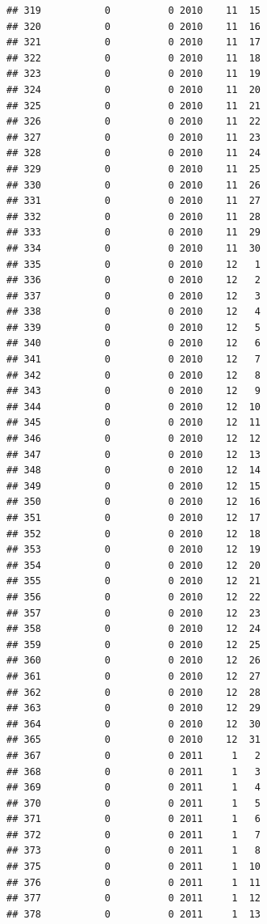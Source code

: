 \documentclass[
]{article}
\begin{document}
\begin{verbatim}
## 319           0          0 2010    11  15
## 320           0          0 2010    11  16
## 321           0          0 2010    11  17
## 322           0          0 2010    11  18
## 323           0          0 2010    11  19
## 324           0          0 2010    11  20
## 325           0          0 2010    11  21
## 326           0          0 2010    11  22
## 327           0          0 2010    11  23
## 328           0          0 2010    11  24
## 329           0          0 2010    11  25
## 330           0          0 2010    11  26
## 331           0          0 2010    11  27
## 332           0          0 2010    11  28
## 333           0          0 2010    11  29
## 334           0          0 2010    11  30
## 335           0          0 2010    12   1
## 336           0          0 2010    12   2
## 337           0          0 2010    12   3
## 338           0          0 2010    12   4
## 339           0          0 2010    12   5
## 340           0          0 2010    12   6
## 341           0          0 2010    12   7
## 342           0          0 2010    12   8
## 343           0          0 2010    12   9
## 344           0          0 2010    12  10
## 345           0          0 2010    12  11
## 346           0          0 2010    12  12
## 347           0          0 2010    12  13
## 348           0          0 2010    12  14
## 349           0          0 2010    12  15
## 350           0          0 2010    12  16
## 351           0          0 2010    12  17
## 352           0          0 2010    12  18
## 353           0          0 2010    12  19
## 354           0          0 2010    12  20
## 355           0          0 2010    12  21
## 356           0          0 2010    12  22
## 357           0          0 2010    12  23
## 358           0          0 2010    12  24
## 359           0          0 2010    12  25
## 360           0          0 2010    12  26
## 361           0          0 2010    12  27
## 362           0          0 2010    12  28
## 363           0          0 2010    12  29
## 364           0          0 2010    12  30
## 365           0          0 2010    12  31
## 367           0          0 2011     1   2
## 368           0          0 2011     1   3
## 369           0          0 2011     1   4
## 370           0          0 2011     1   5
## 371           0          0 2011     1   6
## 372           0          0 2011     1   7
## 373           0          0 2011     1   8
## 375           0          0 2011     1  10
## 376           0          0 2011     1  11
## 377           0          0 2011     1  12
## 378           0          0 2011     1  13

\end{verbatim}
\end{document}
